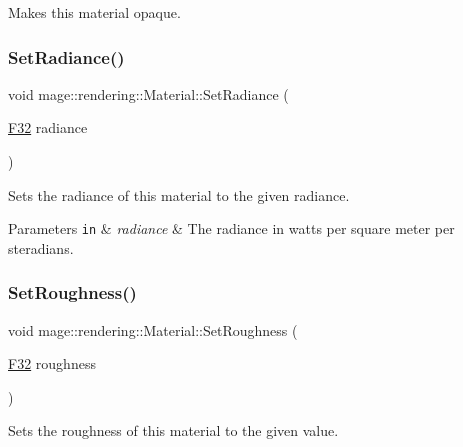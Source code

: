 Makes this material opaque. \mbox{\label{classmage_1_1rendering_1_1_material_ae41261db79de572b75e2615abadc2aaa}} 
\subsubsection{\texorpdfstring{Set\+Radiance()}{SetRadiance()}}
{\footnotesize\ttfamily void mage\+::rendering\+::\+Material\+::\+Set\+Radiance (\begin{DoxyParamCaption}\item[{\mbox{\hyperlink{namespacemage_aa97e833b45f06d60a0a9c4fc22ae02c0}{F32}}}]{radiance }\end{DoxyParamCaption})\hspace{0.3cm}{\ttfamily [noexcept]}}

Sets the radiance of this material to the given radiance.


\begin{DoxyParams}[1]{Parameters}
\mbox{\tt in}  & {\em radiance} & The radiance in watts per square meter per steradians. \\
\hline
\end{DoxyParams}
\mbox{\label{classmage_1_1rendering_1_1_material_a1504fb6523526ee9897b20851a3b84e9}} 
\subsubsection{\texorpdfstring{Set\+Roughness()}{SetRoughness()}}
{\footnotesize\ttfamily void mage\+::rendering\+::\+Material\+::\+Set\+Roughness (\begin{DoxyParamCaption}\item[{\mbox{\hyperlink{namespacemage_aa97e833b45f06d60a0a9c4fc22ae02c0}{F32}}}]{roughness }\end{DoxyParamCaption})\hspace{0.3cm}{\ttfamily [noexcept]}}

Sets the roughness of this material to the given value.


